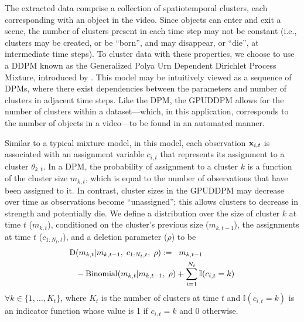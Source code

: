\documentclass[twocolumn, final]{svjour3}
\begin{document}
The extracted data comprise a collection of spatiotemporal clusters, each corresponding with an object in the video. Since objects can enter and exit a scene, the number of clusters present in each time step may not be constant (i.e., clusters may be created, or be ``born'', and may disappear, or ``die'', at intermediate time steps). To cluster data with these properties, we choose to use a DDPM known as the Generalized Polya Urn Dependent Dirichlet Process Mixture, introduced by \cite{caron_2007}. This model may be intuitively viewed as a sequence of DPMs, where there exist dependencies between the parameters and number of clusters in adjacent time steps. Like the DPM, the GPUDDPM allows for the number of clusters within a dataset---which, in this application, corresponds to the number of objects in a video---to be found in an automated manner.

Similar to a typical mixture model, in this model, each observation $\bold{x}_{i,t}$ is associated with an assignment variable $c_{i,t}$ that represents its assignment to a cluster $\theta_{k,t}$. In a DPM, the probability of assignment to a cluster $k$ is a function of the cluster size $m_{k,t}$, which is equal to the number of observations that have been assigned to it. In contrast, cluster sizes in the GPUDDPM may decrease over time as observations become ``unassigned''; this allows clusters to decrease in strength and potentially die. We define a distribution over the size of cluster $k$ at time $t$ ($m_{k,t}$), conditioned on the cluster's previous size ($m_{k,t-1}$), the assignments at time $t$ ($c_{1:N_{t}, t}$), and a deletion parameter ($\rho$) to be
\begin{equation}
\begin{split}
\label{D_distro}
\text{D} &(m_{k,t} | m_{k,t-1}, \hspace{1mm} c_{1:N_{t}, t}, \hspace{1mm} \rho) := \hspace{2mm} m_{k,t-1} \\
&- \text{Binomial}( m_{k,t} | {m_{k,t-1}, \hspace{1mm} \rho}) + \sum_{i=1}^{N_{t}} \mathbb{I}(c_{i,t} = k)
\end{split}
\end{equation}
$\forall k \in \{1, \ldots, K_{t} \}$, where $K_{t}$ is the number of clusters at time $t$ and $\mathbb{I}(c_{i,t} = k)$ is an indicator function whose value is 1 if $c_{i,t} = k$ and 0 otherwise.
\end{document}
